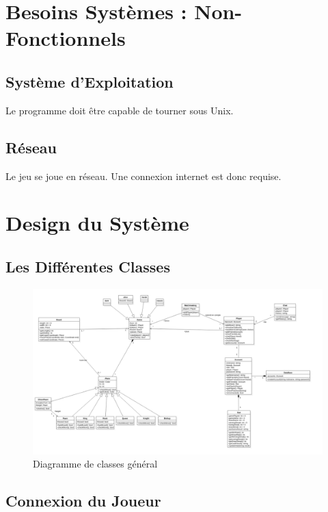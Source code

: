 \documentclass[10pt, a4paper]{article}
\begin{document}
\section{Besoins Systèmes : Non-Fonctionnels}


\subsection{Système d'Exploitation}
Le programme doit être capable de tourner sous Unix. \\

\subsection{Réseau}
Le jeu se joue en réseau. Une connexion internet est donc requise. \\

\section{Design du Système}

\subsection{Les Différentes Classes}


\begin{figure}
\includegraphics[scale=0.5]{ClassDiagram.png}
\caption{Diagramme de classes général}
\label{CD} %
\end{figure}

\newpage

\subsection{Connexion du Joueur}
\end{document}
